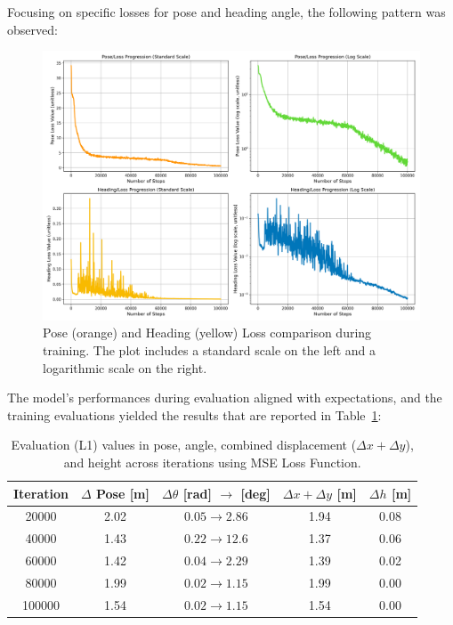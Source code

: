 Focusing on specific losses for pose and heading angle, the following pattern was observed:
\begin{figure}[H]
    \centering
    \includegraphics[width=1\linewidth]{LateX//figs/mse_pose_heading_loss_comparison.png}
    \caption{Pose (orange) and Heading (yellow) Loss comparison during training. The plot includes a standard scale on the left and a logarithmic scale on the right.}
    \label{fig:pose-heading-loss}
\end{figure}

The model's performances during evaluation aligned with expectations, and the training evaluations yielded the results that are reported in Table~\ref{tab:pose_variations_mse}:
\begin{table}[H]
    \centering
    \scriptsize
    \renewcommand{\arraystretch}{1.2} 
    \setlength{\tabcolsep}{10pt}
    \begin{tabular}{c c c c c}
        \toprule
        \textbf{Iteration} & \textbf{$\Delta$ Pose [m]} & \textbf{$\Delta \theta$ [rad] $\rightarrow$ [deg]} & \textbf{$\Delta x + \Delta y$ [m]} & \textbf{$\Delta h$ [m]} \\
        \midrule
        \num{20000}  & 2.02 & $0.05 \rightarrow 2.86$  & 1.94 & 0.08 \\
        \num{40000}  & 1.43 & $0.22 \rightarrow 12.6$  & 1.37 & 0.06 \\
        \num{60000}  & 1.42 & $0.04 \rightarrow 2.29$  & 1.39 & 0.02 \\
        \num{80000}  & 1.99 & $0.02 \rightarrow 1.15$  & 1.99 & 0.00 \\
        \num{100000} & 1.54 & $0.02 \rightarrow 1.15$  & 1.54 & 0.00 \\
        \bottomrule
    \end{tabular}
    \caption{Evaluation (L1) values in pose, angle, combined displacement ($\Delta x + \Delta y$), and height across iterations using MSE Loss Function.}
    \label{tab:pose_variations_mse}
\end{table}

